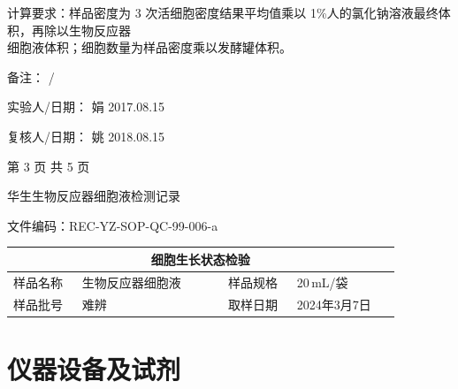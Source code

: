 \documentclass[UTF8,10pt,a4paper,fontset=fandol]{ctexart}
\newcommand{\fieldvalue}[1]{#1}
\newcommand{\handwritten}[1]{#1}
\begin{document}
\noindent
计算要求：样品密度为 3 次活细胞密度结果平均值乘以 1\%人的氯化钠溶液最终体积，再除以生物反应器\\
细胞液体积；细胞数量为样品密度乘以发酵罐体积。

\medskip
\noindent
备注：
\fieldvalue{\handwritten{/}}

\medskip
\noindent
实验人/日期：
\fieldvalue{\handwritten{娟}}
\quad
\fieldvalue{\handwritten{2017.08.15}}

\medskip
\noindent
复核人/日期：
\fieldvalue{\handwritten{姚}}
\quad
\fieldvalue{\handwritten{2018.08.15}}

\begin{flushright}
第 3 页 共 5 页
\end{flushright}

\newpage

\begin{center}
华生生物反应器细胞液检测记录
\end{center}

\noindent 文件编码：REC-YZ-SOP-QC-99-006-a

\begin{center}
\begin{tabular}{|p{0.16\linewidth}|p{0.34\linewidth}|p{0.16\linewidth}|p{0.24\linewidth}|}
\hline
\multicolumn{4}{c|}{细胞生长状态检验}\\
\hline
样品名称 &
\fieldvalue{生物反应器细胞液} &
样品规格 &
\fieldvalue{\handwritten{20}}\,mL/袋\\
\hline
样品批号 &
\fieldvalue{\handwritten{难辨}} &
取样日期 &
\fieldvalue{\handwritten{2024年3月7日}}\\
\hline
\end{tabular}
\end{center}

\section{仪器设备及试剂}
\end{document}
